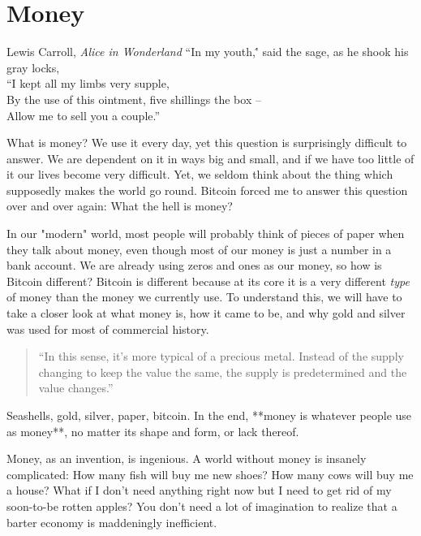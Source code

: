 \chapter{ Money}
\label{les:11}

\begin{chapquote}{Lewis Carroll, \textit{Alice in Wonderland}}
``In my youth,\'' said the sage, as he shook his gray locks, \\
``I kept all my limbs very supple, \\
By the use of this ointment, five shillings the box -- \\
Allow me to sell you a couple.''
\end{chapquote}

What is money? We use it every day, yet this question is surprisingly
difficult to answer. We are dependent on it in ways big and small, and
if we have too little of it our lives become very difficult. Yet, we
seldom think about the thing which supposedly makes the world go round.
Bitcoin forced me to answer this question over and over again: What the
hell is money?

In our "modern" world, most people will probably think of pieces of
paper when they talk about money, even though most of our money is just
a number in a bank account. We are already using zeros and ones as our
money, so how is Bitcoin different? Bitcoin is different because at its
core it is a very different \textit{type} of money than the money we currently
use. To understand this, we will have to take a closer look at what
money is, how it came to be, and why gold and silver was used for most
of commercial history.

\begin{quotation}
``In this sense, it's more typical of a precious metal. Instead of the
supply changing to keep the value the same, the supply is
predetermined and the value changes.''
\end{quotation}

Seashells, gold, silver, paper, bitcoin. In the end, **money is whatever
people use as money**, no matter its shape and form, or lack thereof.

Money, as an invention, is ingenious. A world without money is insanely
complicated: How many fish will buy me new shoes? How many cows will buy
me a house? What if I don't need anything right now but I need to get
rid of my soon-to-be rotten apples? You don't need a lot of imagination
to realize that a barter economy is maddeningly inefficient.

